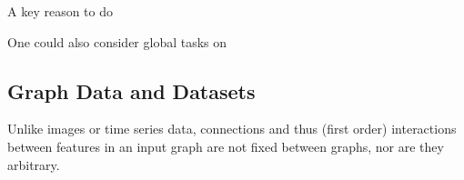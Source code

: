 \documentclass[../main.tex]{subfiles}
\begin{document}
    A key reason to do



    One could also consider global tasks on

    \subsection{Graph Data and Datasets}\label{subsec:graph-datasets}
    Unlike images or time series data, connections and thus (first order) interactions between features in an input graph are not fixed between graphs, nor are they arbitrary.
\end{document}
